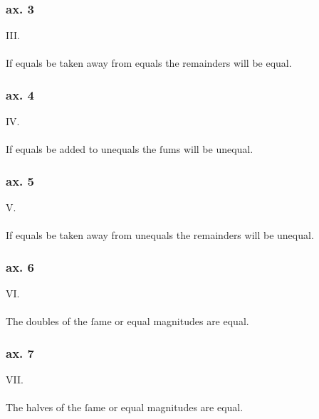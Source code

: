 \begin{minipage}{0.33\textwidth}
    \phantom{}
\end{minipage}%
\begin{minipage}{0.67\textwidth}
    \subsubsection{ax. 3}
    \begin{center}
        III.\label{ax3}\\
        \hfill\\
        If equals be taken away from equals the remainders will be equal.\\
    \end{center}
    \subsubsection{ax. 4}
    \begin{center}
        IV.\label{ax4}\\
        \hfill\\
        If equals be added to unequals the ſums will be unequal.\\
    \end{center}
    \subsubsection{ax. 5}
    \begin{center}
        V.\label{ax5}\\
        \hfill\\
        If equals be taken away from unequals the remainders will be \mbox{unequal}.
    \end{center}
    \subsubsection{ax. 6}
    \begin{center}
        VI.\label{ax6}\\
        \hfill\\
        The doubles of the ſame or equal magnitudes are equal.\\
    \end{center}
    \subsubsection{ax. 7}
    \begin{center}
        VII.\label{ax7}\\
        \hfill\\
        The halves of the ſame or equal magnitudes are equal.\\
    \end{center}

\end{minipage}

